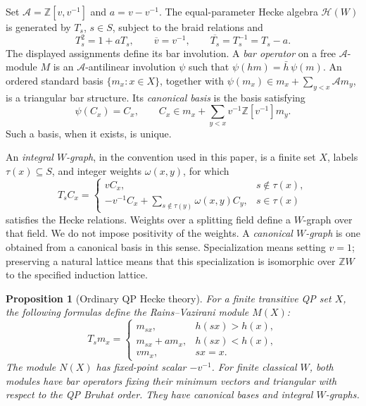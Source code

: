 \documentclass[11pt]{article}
\numberwithin{equation}{section}
\newtheorem{proposition}[theorem]{Proposition}
\theoremstyle{definition}
\newcommand{\Z}{\mathbb Z}
\newcommand{\A}{\mathcal A}
\newcommand{\HH}{\mathcal H}
\begin{document}
Set \(\A=\Z[v,v^{-1}]\) and \(a=v-v^{-1}\).
The equal-parameter Hecke algebra \(\HH(W)\) is generated by \(T_s\), \(s\in S\), subject to the braid relations and
\[
 T_s^2=1+aT_s,\qquad
 \overline v=v^{-1},\qquad \overline{T_s}=T_s^{-1}=T_s-a.
\]
The displayed assignments define its bar involution.
A \emph{bar operator} on a free \(\A\)-module \(M\) is an \(\A\)-antilinear involution \(\psi\) such that
\(\psi(hm)=\bar h\,\psi(m)\).
An ordered standard basis \(\{m_x:x\in X\}\), together with
\(\psi(m_x)\in m_x+\sum_{y<x}\A m_y\), is a triangular bar structure.
Its \emph{canonical basis} is the basis satisfying
\begin{equation}
 \psi(C_x)=C_x,\qquad
 C_x\in m_x+\sum_{y<x}v^{-1}\Z[v^{-1}]m_y .
 \label{eq:canonical-def}
\end{equation}
Such a basis, when it exists, is unique.

An \emph{integral \(W\)-graph}, in the convention used in this paper, is a finite set \(X\), labels
\(\tau(x)\subseteq S\), and integer weights \(\omega(x,y)\), for which
\begin{equation}
 T_s C_x=
 \begin{cases}
 vC_x,&s\notin\tau(x),\\
 -v^{-1}C_x+\displaystyle\sum_{s\notin\tau(y)}\omega(x,y)C_y,&s\in\tau(x)
 \end{cases}
 \label{eq:Wgraph-def}
\end{equation}
satisfies the Hecke relations.
Weights over a splitting field define a \(W\)-graph over that field.
We do not impose positivity of the weights.
A \emph{canonical \(W\)-graph} is one obtained from a canonical basis in this sense.
Specialization means setting \(v=1\); preserving a natural lattice means that this specialization is isomorphic over \(\Z W\) to the specified induction lattice.

\begin{proposition}[Ordinary QP Hecke theory]
\label{prop:barinput}
For a finite transitive QP set \(X\), the following formulas define the Rains--Vazirani module \(M(X)\):
\begin{equation}
 T_s m_x=
 \begin{cases}
 m_{sx},&h(sx)>h(x),\\
 m_{sx}+a m_x,&h(sx)<h(x),\\
 vm_x,&sx=x.
 \end{cases}
 \label{eq:ordinaryM}
\end{equation}
The module \(N(X)\) has fixed-point scalar \(-v^{-1}\).
For finite classical \(W\), both modules have bar operators fixing their minimum vectors and triangular with respect to the QP Bruhat order.
They have canonical bases and integral \(W\)-graphs.
\end{proposition}
\end{document}

